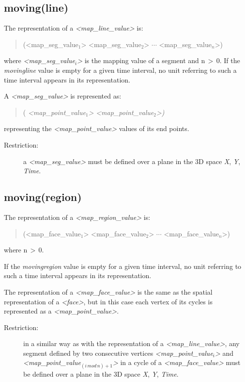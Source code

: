 \documentclass[english,a4paper]{article}
\begin{document}
\subsection{moving(line)}

The representation of a \emph{<map\_line\_value>} is:

\begin{quotation}
(<map\_seg\_value$_{1}$> <map\_seg\_value$_{2}$> $\cdots $ <map\_seg\_value$_{n}$>)
\end{quotation}
where \emph{<map\_seg\_value$_{i}$>} is the mapping value of a segment
and n$\, >\, $0. If the \emph{movingline} value is empty for a given
time interval, no unit referring to such a time interval appears in
its representation.

A \emph{<map\_seg\_value>} is represented as:

\begin{quotation}
( \emph{<map\_point\_value$_{1}$>} \emph{<map\_point\_value$_{2}$>)}
\end{quotation}
representing the \emph{<map\_point\_value>} values of its end points.

\begin{description}
\item [Restriction:]a \emph{<map\_seg\_value>} must be defined over a plane
in the 3D space \emph{X}, \emph{Y}, \emph{Time}.
\end{description}

\subsection{moving(region)}

The representation of a \emph{<map\_region\_value>} is:

\begin{quotation}
(<map\_face\_value$_{1}$> <map\_face\_value$_{2}$> $\cdots $ <map\_face\_value$_{n}$>)
\end{quotation}
where n$\, >\, $0.

If the \emph{movingregion} value is empty for a given time interval,
no unit referring to such a time interval appears in its representation.

The representation of a \emph{<map\_face\_value>} is the same as the
spatial representation of a \emph{<face>}, but in this case each vertex
of its cycles is represented as a \emph{<map\_point\_value>}.

\begin{description}
\item [Restriction:]in a similar way as with the representation of a \emph{<map\_line\_value>},
any segment defined by two consecutive vertices \emph{<map\_point\_value$_{i}$>}
and \emph{<map\_point\_value$_{(i\, mod\, n)+1}$>} in a cycle of
a \emph{<map\_face\_value>} must be defined over a plane in the 3D
space \emph{X}, \emph{Y}, \emph{Time}.\end{description}
\end{document}
